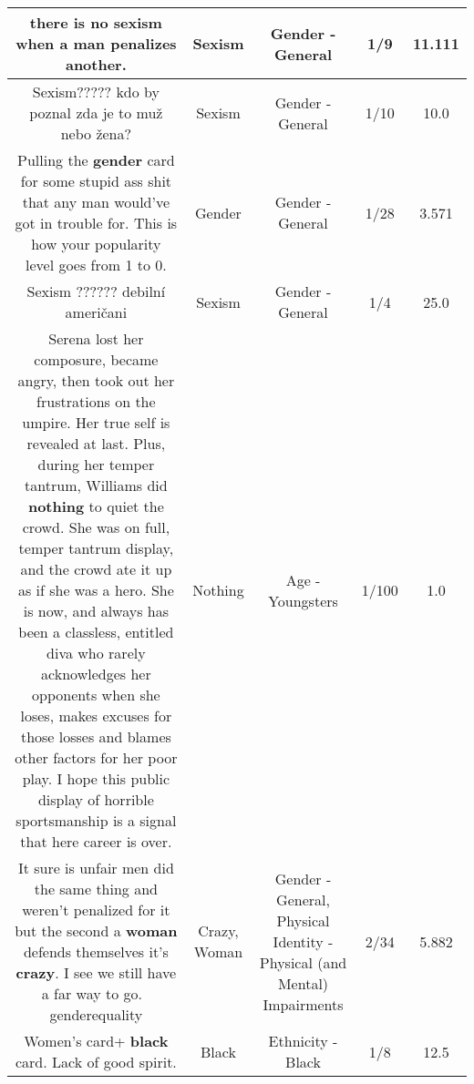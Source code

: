 \documentclass[11pt]{article}
\newlength\mylength
\begin{document}
\begin{center}
\begin{longtable}{|C{.65\mylength}|C{.30\mylength}|C{.12\mylength}|C{.12\mylength}|C{.12\mylength}|}
  \small there is no \textbf{sexism} when a man penalizes another.\normalsize   & Sexism & Gender - General & 1/9 & 11.111 \\  \hline
  \small Sexism????? kdo by poznal zda je to muž nebo žena?\normalsize   & Sexism & Gender - General & 1/10 & 10.0 \\  \hline
  \small Pulling the \textbf{gender} card for some stupid ass shit that any man would've got in trouble for. This is how your popularity level goes from 1 to 0.\normalsize   & Gender & Gender - General & 1/28 & 3.571 \\  \hline
  \small Sexism ?????? debilní američani\normalsize   & Sexism & Gender - General & 1/4 & 25.0 \\  \hline
  \small Serena lost her composure, became angry, then took out her frustrations on the umpire. Her true self is revealed at last. Plus, during her temper tantrum, Williams did \textbf{nothing} to quiet the crowd. She was on full, temper tantrum display, and the crowd ate it up as if she was a hero. She is now, and always has been a classless, entitled diva who rarely acknowledges her opponents when she loses, makes excuses for those losses and blames other factors for her poor play. I hope this public display of horrible sportsmanship is a signal that here career is over.\normalsize   & Nothing & Age - Youngsters & 1/100 & 1.0 \\  \hline
  \small It sure is unfair men did the same thing and weren't penalized for it but the second a \textbf{woman} defends themselves it's \textbf{crazy}. I see we still have a far way to go.💪💪 genderequality\normalsize   & Crazy, Woman & Gender - General, Physical Identity - Physical (and Mental) Impairments & 2/34 & 5.882 \\  \hline
  \small Women's card+ \textbf{black} card. Lack of good spirit.\normalsize   & Black & Ethnicity - Black & 1/8 & 12.5 \\  \hline

\end{longtable}
\end{center}
\end{document}
